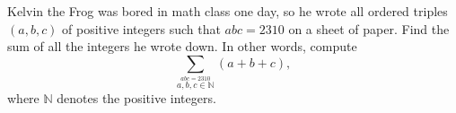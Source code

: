 Kelvin the Frog was bored in math class one day, so he wrote all ordered triples $(a, b, c)$ of positive integers such that $abc=2310$ on a sheet of paper. Find the sum of all the integers he wrote down. In other words, compute $$\sum_{\stackrel{abc=2310}{a,b,c\in \mathbb{N}}} (a+b+c),$$where $\mathbb{N}$ denotes the positive integers.